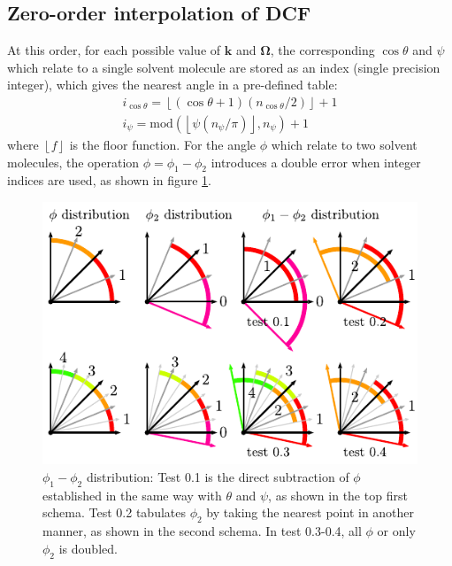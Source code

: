 \subsection{Zero-order interpolation of DCF\label{subsec:Zero-order-interpolation-of}}

At this order, for each possible value of $\mathbf{k}$ and $\mathbf{\Omega}$,
the corresponding $\cos\theta$ and $\psi$ which relate to a single
solvent molecule are stored as an index (single precision integer),
which gives the nearest angle in a pre-defined table:
\begin{equation}
\begin{array}{l}
i_{\cos\theta}=\left\lfloor (\cos\theta+1)(n_{\cos\theta}/2)\right\rfloor +1\\
i_{\psi}=\mathrm{mod}(\left\lfloor \psi(n_{\psi}/\pi)\right\rfloor ,n_{\psi})+1
\end{array}
\end{equation}
where $\left\lfloor f\right\rfloor $ is the floor function. For the
angle $\phi$ which relate to two solvent molecules, the operation
$\phi=\phi_{1}-\phi_{2}$ introduces a double error when integer indices
are used, as shown in figure \ref{fig:diff_phi}.

\begin{figure}[h]
\begin{centering}
\includegraphics{_figure/diff_phi}
\par\end{centering}
\caption[$\phi_{1}-\phi_{2}$ distribution]{$\phi_{1}-\phi_{2}$ distribution: Test 0.1 is the direct subtraction
of $\phi$ established in the same way with $\theta$ and $\psi$,
as shown in the top first schema. Test 0.2 tabulates $\phi_{2}$ by
taking the nearest point in another manner, as shown in the second
schema. In test 0.3-0.4, all $\phi$ or only $\phi_{2}$ is doubled.\label{fig:diff_phi}}
\end{figure}

